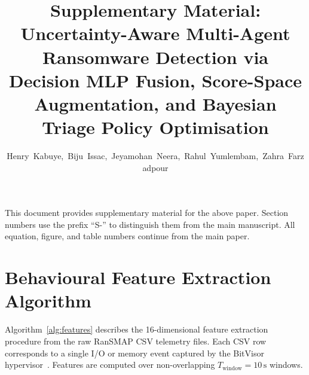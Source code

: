 \documentclass[journal]{IEEEtran}
\begin{document}
\title{Supplementary Material: Uncertainty-Aware Multi-Agent Ransomware
Detection via Decision MLP Fusion, Score-Space Augmentation, and
Bayesian Triage Policy Optimisation}

\author{Henry~Kabuye,~Biju~Issac,~Jeyamohan~Neera,~Rahul~Yumlembam,~Zahra~Farzadpour}

\maketitle

This document provides supplementary material for the above paper.
Section numbers use the prefix ``S-'' to distinguish them from the main
manuscript.
All equation, figure, and table numbers continue from the main paper.

\section{Behavioural Feature Extraction Algorithm}\label{sec:supp_features}

Algorithm~\ref{alg:features} describes the 16-dimensional feature extraction
procedure from the raw RanSMAP CSV telemetry files.
Each CSV row corresponds to a single I/O or memory event captured by the
BitVisor hypervisor~\cite{hirano2025ransmap}.
Features are computed over non-overlapping $T_{\text{window}}{=}10\,\text{s}$ windows.
\end{document}

